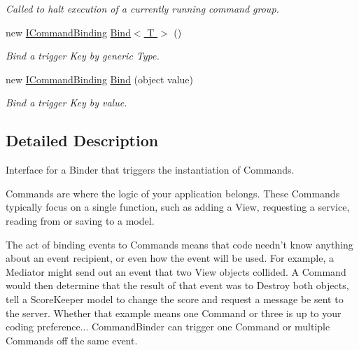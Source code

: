 \begin{DoxyCompactItemize}
\begin{DoxyCompactList}\small\item\em Called to halt execution of a currently running command group. \end{DoxyCompactList}\item 
\hypertarget{interfacestrange_1_1extensions_1_1command_1_1api_1_1_i_command_binder_a325a3e15e4a1efb6b35d624c2f940063}{new \hyperlink{interfacestrange_1_1extensions_1_1command_1_1api_1_1_i_command_binding}{I\-Command\-Binding} \hyperlink{interfacestrange_1_1extensions_1_1command_1_1api_1_1_i_command_binder_a325a3e15e4a1efb6b35d624c2f940063}{Bind$<$ T $>$} ()}\label{interfacestrange_1_1extensions_1_1command_1_1api_1_1_i_command_binder_a325a3e15e4a1efb6b35d624c2f940063}

\begin{DoxyCompactList}\small\item\em Bind a trigger Key by generic Type. \end{DoxyCompactList}\item 
\hypertarget{interfacestrange_1_1extensions_1_1command_1_1api_1_1_i_command_binder_a3e3e87b88d2e817dfbb183a8b947d909}{new \hyperlink{interfacestrange_1_1extensions_1_1command_1_1api_1_1_i_command_binding}{I\-Command\-Binding} \hyperlink{interfacestrange_1_1extensions_1_1command_1_1api_1_1_i_command_binder_a3e3e87b88d2e817dfbb183a8b947d909}{Bind} (object value)}\label{interfacestrange_1_1extensions_1_1command_1_1api_1_1_i_command_binder_a3e3e87b88d2e817dfbb183a8b947d909}

\begin{DoxyCompactList}\small\item\em Bind a trigger Key by value. \end{DoxyCompactList}\end{DoxyCompactItemize}


\subsection{Detailed Description}
Interface for a Binder that triggers the instantiation of Commands. 

Commands are where the logic of your application belongs. These Commands typically focus on a single function, such as adding a View, requesting a service, reading from or saving to a model.

The act of binding events to Commands means that code needn't know anything about an event recipient, or even how the event will be used. For example, a Mediator might send out an event that two View objects collided. A Command would then determine that the result of that event was to Destroy both objects, tell a Score\-Keeper model to change the score and request a message be sent to the server. Whether that example means one Command or three is up to your coding preference... Command\-Binder can trigger one Command or multiple Commands off the same event.

